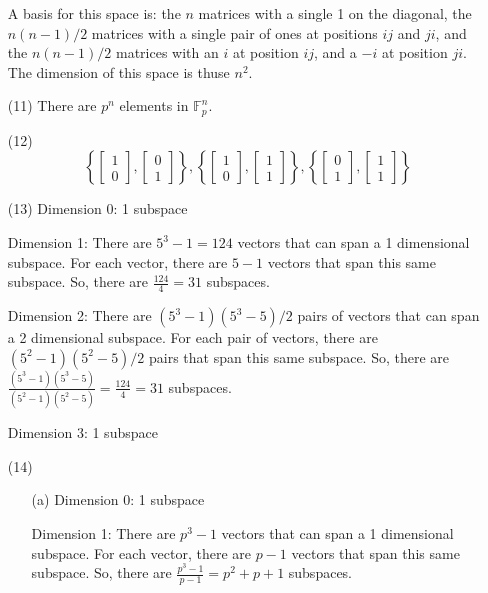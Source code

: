 \begin{itemize}
A basis for this space is: the $n$ matrices with a single 1 on the diagonal, the $n(n - 1)/2$ matrices with a single pair of ones at positions $ij$ and $ji$, and the $n(n - 1)/2$ matrices with an $i$ at position $ij$, and a $-i$ at position $ji$. The dimension of this space is thuse $n^2$.
\item[(11)]
There are $p^n$ elements in $\mathbb{F}_p^n$.
\item[(12)]
$$\left\lbrace \begin{bmatrix}
1 \\
0
\end{bmatrix}, \begin{bmatrix}
0 \\
1
\end{bmatrix} \right\rbrace, \left\lbrace \begin{bmatrix}
1 \\
0
\end{bmatrix}, \begin{bmatrix}
1 \\
1
\end{bmatrix} \right\rbrace, \left\lbrace
\begin{bmatrix}
0 \\
1
\end{bmatrix}, \begin{bmatrix}
1 \\
1
\end{bmatrix} \right\rbrace$$
\item[(13)]
Dimension 0: 1 subspace

Dimension 1: There are $5^3 - 1 = 124$ vectors that can span a 1 dimensional subspace. For each vector, there are $5 - 1$ vectors that span this same subspace. So, there are $\frac{124}{4} = 31$ subspaces.

Dimension 2: There are $(5^3 - 1)(5^3 - 5)/2$ pairs of vectors that can span a 2 dimensional subspace. For each pair of vectors, there are $(5^2 - 1)(5^2 - 5)/2$ pairs that span this same subspace. So, there are $\frac{(5^3 - 1)(5^3 - 5)}{(5^2 - 1)(5^2 - 5)} = \frac{124}{4} = 31$ subspaces.

Dimension 3: 1 subspace
\item[(14)]
\begin{itemize}
\item[(a)]
Dimension 0: 1 subspace

Dimension 1: There are $p^3 - 1$ vectors that can span a 1 dimensional subspace. For each vector, there are $p - 1$ vectors that span this same subspace. So, there are $\frac{p^3 - 1}{p - 1} = p^2 + p + 1$ subspaces.


\end{itemize}
\end{itemize}
